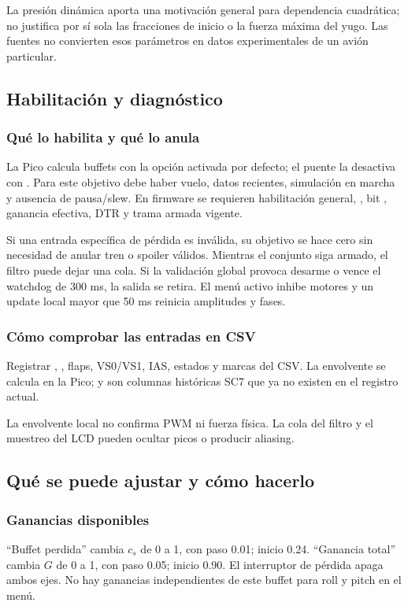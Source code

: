 La presión dinámica aporta una motivación general para dependencia cuadrática; no justifica por sí sola las fracciones de inicio o la fuerza máxima del yugo. Las fuentes no convierten esos parámetros en datos experimentales de un avión particular.

\subsection{Habilitación y diagnóstico}
\subsubsection{Qué lo habilita y qué lo anula}
La Pico calcula buffets con la opción activada por defecto; el puente la desactiva con . Para este objetivo debe haber vuelo, datos recientes, simulación en marcha y ausencia de pausa/slew. En firmware se requieren habilitación general, , bit , ganancia efectiva, DTR y trama armada vigente.

Si una entrada específica de pérdida es inválida, su objetivo se hace cero sin necesidad de anular tren o spoiler válidos. Mientras el conjunto siga armado, el filtro puede dejar una cola. Si la validación global provoca desarme o vence el watchdog de 300 ms, la salida se retira. El menú activo inhibe motores y un update local mayor que 50 ms reinicia amplitudes y fases.

\subsubsection{Cómo comprobar las entradas en CSV}
Registrar , , flaps, VS0/VS1, IAS, estados y marcas del CSV. La envolvente se calcula en la Pico;  y  son columnas históricas SC7 que ya no existen en el registro actual.

La envolvente local no confirma PWM ni fuerza física. La cola del filtro y el muestreo del LCD pueden ocultar picos o producir aliasing.

\subsection{Qué se puede ajustar y cómo hacerlo}
\subsubsection{Ganancias disponibles}
``Buffet perdida'' cambia $c_s$ de 0 a 1, con paso 0.01; inicio 0.24. ``Ganancia total'' cambia $G$ de 0 a 1, con paso 0.05; inicio 0.90. El interruptor de pérdida apaga ambos ejes. No hay ganancias independientes de este buffet para roll y pitch en el menú.

